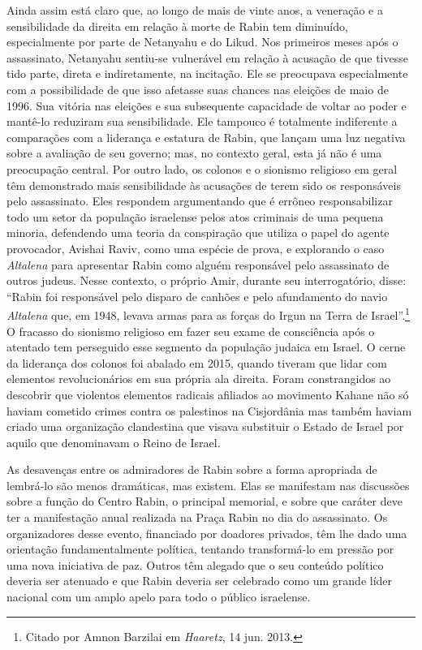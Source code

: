 Ainda assim está claro que, ao longo de mais de vinte anos, a veneração
e a sensibilidade da direita em relação à morte de Rabin tem
diminuído, especialmente por parte de Netanyahu e do Likud. Nos
primeiros meses após o assassinato, Netanyahu sentiu-se vulnerável em
relação à acusação de que tivesse tido parte, direta e indiretamente, na
incitação. Ele se preocupava especialmente com a possibilidade de que isso
afetasse suas chances nas eleições de maio de 1996. Sua vitória nas
eleições e sua subsequente capacidade de voltar ao poder e mantê-lo
reduziram sua sensibilidade. Ele tampouco é totalmente indiferente a
comparações com a liderança e estatura de Rabin, que lançam uma luz
negativa sobre a avaliação de seu governo; mas, no contexto geral, esta já
não é uma preocupação central. Por outro lado, os colonos e o sionismo
religioso em geral têm demonstrado mais sensibilidade às acusações de
terem sido os responsáveis pelo assassinato. Eles respondem
argumentando que é errôneo responsabilizar todo um setor da população
israelense pelos atos criminais de uma pequena minoria, defendendo uma
teoria da conspiração que utiliza o papel do agente provocador, Avishai
Raviv, como uma espécie de prova, e explorando o caso \emph{Altalena}
para apresentar Rabin como alguém responsável pelo assassinato de outros
judeus. Nesse contexto, o próprio Amir, durante seu interrogatório,
disse: ``Rabin foi responsável pelo disparo de canhões e pelo
afundamento do navio \emph{Altalena} que, em 1948, levava armas para as
forças do Irgun na Terra de Israel''.\footnote{Citado por Amnon Barzilai 
em \emph{Haaretz}, 14 jun. 2013.} O fracasso do sionismo
religioso em fazer seu exame de consciência após o atentado tem
perseguido esse segmento da população judaica em Israel. O cerne da
liderança dos colonos foi abalado em 2015, quando tiveram que lidar com
elementos revolucionários em sua própria ala direita. Foram
constrangidos ao descobrir que violentos elementos radicais afiliados ao
movimento Kahane não só haviam cometido crimes contra os palestinos na
Cisjordânia mas também haviam criado uma organização clandestina que
visava substituir o Estado de Israel por aquilo que denominavam o Reino
de Israel.

As desavenças entre os admiradores de Rabin sobre a forma apropriada de
lembrá-lo são menos dramáticas, mas existem. Elas se manifestam nas
discussões sobre a função do Centro Rabin, o principal memorial, e sobre
que caráter deve ter a manifestação anual realizada na Praça Rabin no
dia do assassinato. Os organizadores desse evento, financiado por
doadores privados, têm lhe dado uma orientação fundamentalmente
política, tentando transformá-lo em pressão por uma nova iniciativa de
paz. Outros têm alegado que o seu conteúdo político deveria ser atenuado
e que Rabin deveria ser celebrado como um grande líder nacional com um
amplo apelo para todo o público israelense.

